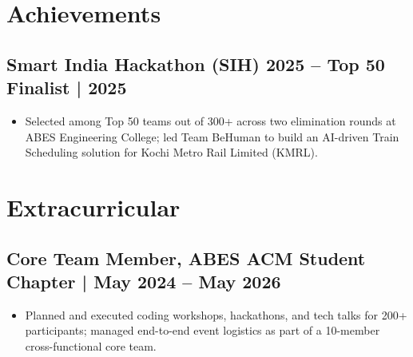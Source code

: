 \documentclass[11pt,letterpaper]{article}
\begin{document}
\section*{Achievements}

\subsection*{Smart India Hackathon (SIH) 2025 -- Top 50 Finalist | 2025}
\begin{itemize}
    \item Selected among Top 50 teams out of 300+ across two elimination rounds at ABES Engineering College; led Team BeHuman to build an AI-driven Train Scheduling solution for Kochi Metro Rail Limited (KMRL).
\end{itemize}

\section*{Extracurricular}

\subsection*{Core Team Member, ABES ACM Student Chapter | May 2024 -- May 2026}
\begin{itemize}
    \item Planned and executed coding workshops, hackathons, and tech talks for 200+ participants; managed end-to-end event logistics as part of a 10-member cross-functional core team.
\end{itemize}
\end{document}
